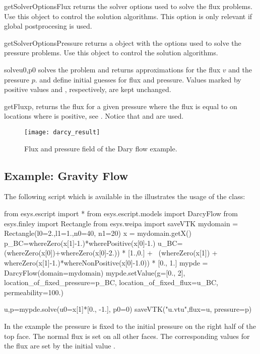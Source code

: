 \begin{methoddesc}[DarcyFlow]{getSolverOptionsFlux}{}
returns the solver options used to solve the flux problems.
Use this \SolverOptions object to control the solution algorithms.
This option is only relevant if global postprocesing is used.
\end{methoddesc}

\begin{methoddesc}[DarcyFlow]{getSolverOptionsPressure}{}
returns a \SolverOptions object with the options used to solve the pressure
problems.
Use this object to control the solution algorithms.
\end{methoddesc}

\begin{methoddesc}[DarcyFlow]{solve}{u0,p0}
solves the problem and returns approximations for the flux $v$ and the pressure $p$.
 and  define initial guesses for flux and pressure.
Values marked by positive values  and
, respectively, are kept unchanged.
\end{methoddesc}

\begin{methoddesc}[DarcyFlow]{getFlux}{p, }
returns the flux for a given pressure  where the flux is equal to 
on locations where  is positive,  see .
Notice that  and  are used.
\end{methoddesc}

\begin{figure}
\centerline{\texttt{[image: darcy\_result]}}
\caption{Flux and pressure field of the Dary flow example.}
\label{DIFFUSION FIG 1}
\end{figure}

\subsection{Example: Gravity Flow}
The following script 
which is available in the \ExampleDirectory illustrates the usage of the
 class:
\begin{python}
   from esys.escript import *
   from esys.escript.models import DarcyFlow
   from esys.finley import Rectangle
   from esys.weipa import saveVTK
   mydomain = Rectangle(l0=2.,l1=1.,n0=40, n1=20)
   x = mydomain.getX()
   p_BC=whereZero(x[1]-1.)*wherePositive(x[0]-1.)
   u_BC=(whereZero(x[0])+whereZero(x[0]-2.)) * [1.,0.] + \
     (whereZero(x[1]) + whereZero(x[1]-1.)*whereNonPositive(x[0]-1.0)) * [0., 1.]
   mypde = DarcyFlow(domain=mydomain)
   mypde.setValue(g=[0., 2],
                  location_of_fixed_pressure=p_BC,
                  location_of_fixed_flux=u_BC,
                  permeability=100.)

   u,p=mypde.solve(u0=x[1]*[0., -1.], p0=0)
   saveVTK("u.vtu",flux=u, pressure=p)
\end{python}
In the example the pressure is fixed to the initial pressure  on the right half of the top face.
The normal flux is set on all other faces. The corresponding values for the flux are set by the initial value
\var{u0}.   
